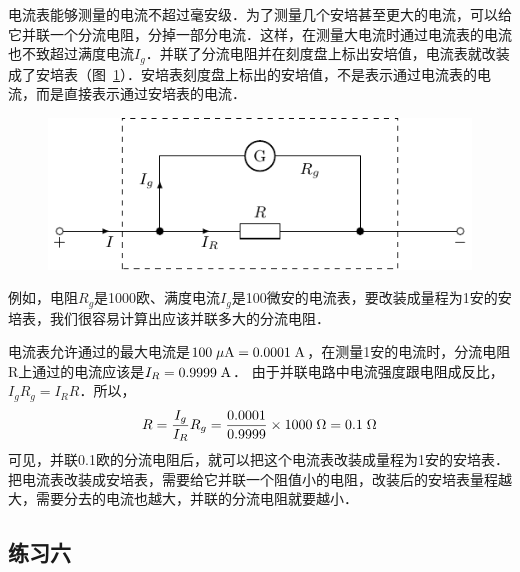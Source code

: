 电流表能够测量的电流不超过毫安级．为了测量几个安培甚至更大的电流，可以给它并联一个分流电阻，分掉一部分电流．这样，在测量大电流时通过电流表的电流也不致超过满度电流$I_g$．并联了分流电阻并在刻度盘上标出安培值，电流表就改装成了安培表（图~\ref{fig_B_7-17}）．安培表刻度盘上标出的安培值，不是表示通过电流表的电流，而是直接表示通过安培表的电流．
\begin{figure}[htbp]
    \centering
    \includegraphics{fig/B/7-17.pdf}
    \caption{}\label{fig_B_7-17}
\end{figure}

例如，电阻$R_g$是1000欧、满度电流$I_g$是100微安的电流表，要改装成量程为1安的安培表，我们很容易计算出应该并联多大的分流电阻．

电流表允许通过的最大电流是$100 \;\mu\text{A}=0.0001 \;\text{A} $，在测量1安的电流时，分流电阻R上通过的电流应该是$I_R=0.9999 \;\text{A} $．
由于并联电路中电流强度跟电阻成反比，$I_gR_g=I_R R$．所以，
\[R=\frac{I_g}{I_R}R_g=\frac{0.0001}{0.9999}\times 1000\;\Omega=0.1\;\Omega\]
可见，并联0.1欧的分流电阻后，就可以把这个电流表改装成量程为1安的安培表．
把电流表改装成安培表，需要给它并联一个阻值小的电阻，改装后的安培表量程越大，需要分去的电流也越大，并联的分流电阻就要越小．


\subsection*{练习六}


